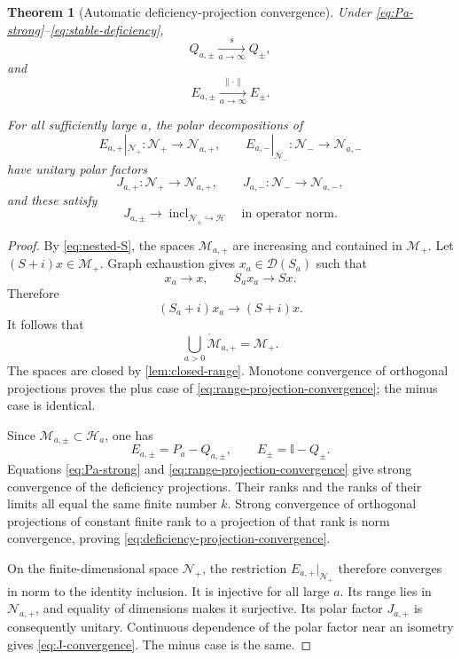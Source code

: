 \documentclass[11pt]{article}
\newtheorem{theorem}{Theorem}[section]
\theoremstyle{remark}
\newcommand{\Hh}{\mathcal H}
\newcommand{\Dom}{\mathcal D}
\newcommand{\Id}{\mathbb I}
\begin{document}
\begin{theorem}[Automatic deficiency-projection convergence]\label{thm:deficiency-convergence}
Under \eqref{eq:Pa-strong}--\eqref{eq:stable-deficiency},
\begin{equation}\label{eq:range-projection-convergence}
 Q_{a,\pm}\xrightarrow[a\to\infty]{\mathrm{s}}Q_\pm,
\end{equation}
and
\begin{equation}\label{eq:deficiency-projection-convergence}
 E_{a,\pm}\xrightarrow[a\to\infty]{\|\cdot\|}E_\pm.
\end{equation}

For all sufficiently large $a$, the polar decompositions of
\[
 E_{a,+}|_{\mathcal N_+}:\mathcal N_+\to\mathcal N_{a,+},
 \qquad
 E_{a,-}|_{\mathcal N_-}:\mathcal N_-\to\mathcal N_{a,-}
\]
have unitary polar factors
\begin{equation}\label{eq:J-def}
 J_{a,+}:\mathcal N_+\to\mathcal N_{a,+},
 \qquad
 J_{a,-}:\mathcal N_-\to\mathcal N_{a,-},
\end{equation}
and these satisfy
\begin{equation}\label{eq:J-convergence}
 J_{a,\pm}\longrightarrow\operatorname{incl}_{\mathcal N_\pm\hookrightarrow\Hh}
 \quad\text{in operator norm}.
\end{equation}
\end{theorem}

\begin{proof}
By \eqref{eq:nested-S}, the spaces $\mathcal M_{a,+}$ are increasing and contained in
$\mathcal M_+$.  Let $(S+i)x\in\mathcal M_+$.  Graph exhaustion gives
$x_a\in\Dom(S_a)$ such that
\[
 x_a\to x,\qquad S_ax_a\to Sx.
\]
Therefore
\[
 (S_a+i)x_a\longrightarrow(S+i)x.
\]
It follows that
\[
 \overline{\bigcup_{a>0}\mathcal M_{a,+}}=\mathcal M_+.
\]
The spaces are closed by \cref{lem:closed-range}.  Monotone convergence of orthogonal projections
proves the plus case of \eqref{eq:range-projection-convergence}; the minus case is identical.

Since $\mathcal M_{a,\pm}\subset\Hh_a$, one has
\begin{equation}\label{eq:E-difference}
 E_{a,\pm}=P_a-Q_{a,\pm},
 \qquad
 E_\pm=\Id-Q_\pm.
\end{equation}
Equations \eqref{eq:Pa-strong} and \eqref{eq:range-projection-convergence} give strong convergence
of the deficiency projections.  Their ranks and the ranks of their limits all equal the same finite
number $k$.  Strong convergence of orthogonal projections of constant finite rank to a projection
of that rank is norm convergence, proving \eqref{eq:deficiency-projection-convergence}.

On the finite-dimensional space $\mathcal N_+$, the restriction
$E_{a,+}|_{\mathcal N_+}$ therefore converges in norm to the identity inclusion.  It is injective
for all large $a$.  Its range lies in $\mathcal N_{a,+}$, and equality of dimensions makes it
surjective.  Its polar factor $J_{a,+}$ is consequently unitary.  Continuous dependence of the
polar factor near an isometry gives \eqref{eq:J-convergence}.  The minus case is the same.
\end{proof}
\end{document}

